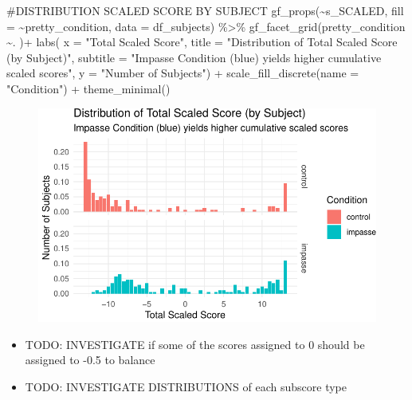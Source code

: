 \documentclass[
  letterpaper,
  DIV=11,
  numbers=noendperiod]{scrreprt}
\newenvironment{Shaded}{\begin{snugshade}}{\end{snugshade}}
\newcommand{\AttributeTok}[1]{\textcolor[rgb]{0.40,0.45,0.13}{#1}}
\newcommand{\CommentTok}[1]{\textcolor[rgb]{0.37,0.37,0.37}{#1}}
\newcommand{\FunctionTok}[1]{\textcolor[rgb]{0.28,0.35,0.67}{#1}}
\newcommand{\NormalTok}[1]{\textcolor[rgb]{0.00,0.23,0.31}{#1}}
\newcommand{\SpecialCharTok}[1]{\textcolor[rgb]{0.37,0.37,0.37}{#1}}
\newcommand{\StringTok}[1]{\textcolor[rgb]{0.13,0.47,0.30}{#1}}
\providecommand{\tightlist}{%
  \setlength{\itemsep}{0pt}\setlength{\parskip}{0pt}}\usepackage{longtable,booktabs,array}
\begin{document}
\begin{Shaded}
\begin{Highlighting}[]
\CommentTok{\#DISTRIBUTION SCALED SCORE BY SUBJECT}
\FunctionTok{gf\_props}\NormalTok{(}\SpecialCharTok{\textasciitilde{}}\NormalTok{s\_SCALED, }\AttributeTok{fill =} \SpecialCharTok{\textasciitilde{}}\NormalTok{pretty\_condition, }\AttributeTok{data =}\NormalTok{ df\_subjects)  }\SpecialCharTok{\%\textgreater{}\%} 
  \FunctionTok{gf\_facet\_grid}\NormalTok{(pretty\_condition }\SpecialCharTok{\textasciitilde{}}\NormalTok{. )}\SpecialCharTok{+}
  \FunctionTok{labs}\NormalTok{( }\AttributeTok{x =} \StringTok{"Total Scaled Score"}\NormalTok{, }
        \AttributeTok{title =} \StringTok{"Distribution of Total Scaled Score (by Subject)"}\NormalTok{,}
        \AttributeTok{subtitle =} \StringTok{"Impasse Condition (blue) yields higher cumulative scaled scores"}\NormalTok{,}
        \AttributeTok{y =} \StringTok{"Number of Subjects"}\NormalTok{) }\SpecialCharTok{+}
  \FunctionTok{scale\_fill\_discrete}\NormalTok{(}\AttributeTok{name =} \StringTok{"Condition"}\NormalTok{) }\SpecialCharTok{+}  
  \FunctionTok{theme\_minimal}\NormalTok{()}
\end{Highlighting}
\end{Shaded}

\begin{figure}[H]

{\centering \includegraphics{analysis/SGC3A/2_sgc3A_scoring_files/figure-pdf/DISTR-SCALEDSCORE-3.pdf}

}

\end{figure}

\begin{itemize}
\tightlist
\item
  TODO: INVESTIGATE if some of the scores assigned to 0 should be
  assigned to -0.5 to balance
\item
  TODO: INVESTIGATE DISTRIBUTIONS of each subscore type
\end{itemize}
\end{document}
